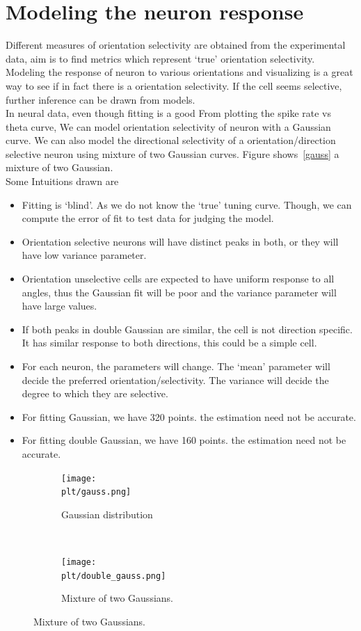 \documentclass[11pt]{article}
\newcommand{\plt}{../../plots}
\newcommand{\rulesep}{\unskip\ \vrule\ }
\begin{document}
\section{Modeling the neuron response} %
\label{sub:modeling_the_neuron_response}
Different measures of orientation selectivity are obtained from the experimental data, aim is to find metrics which represent `true' orientation selectivity. Modeling the response of neuron to various orientations and visualizing is a great way to see if in fact there is a orientation selectivity. If the cell seems selective, further inference can be drawn from models.\\
In neural data, even though fitting is a good 
From plotting the spike rate vs theta curve, We can model orientation selectivity of neuron with a Gaussian curve. We can also model the directional selectivity of a orientation/direction selective neuron using mixture of two Gaussian curves. Figure shows~\ref{gauss} a mixture of two Gaussian.\\
Some Intuitions drawn are
\begin{itemize}
    \item Fitting is `blind'. As we do not know the `true' tuning curve. Though, we can compute the error of fit to test data for judging the model.
    \item Orientation selective neurons will have distinct peaks in both, or they will have low variance parameter.
    \item Orientation unselective cells are expected to have uniform response to all angles, thus the Gaussian fit will be poor and the variance parameter will have large values.
    \item If both peaks in double Gaussian are similar, the cell is not direction specific. It has similar response to both directions, this could be a simple cell.
    \item For each neuron, the parameters will change. The `mean' parameter will decide the preferred orientation/selectivity. The variance will decide the degree to which they are selective.
    \item For fitting Gaussian,  we have 320 points. the estimation need not be accurate.
    \item For fitting double Gaussian,  we have 160 points. the estimation need not be accurate.
\end{itemize}

\begin{figure}
\centering
\caption{Modeling orientation and directional selectivity using Gaussians}
\label{gauss}
\begin{subfigure}{.48\textwidth}
    \centering
    \texttt{[image: \\plt/gauss.png]}
    \caption{Gaussian distribution}
\end{subfigure}
\rulesep
\begin{subfigure}{.48\textwidth}
    \centering
    \texttt{[image: \\plt/double\_gauss.png]}
    \caption{Mixture of two Gaussians.}
\end{subfigure}
\end{figure}
\end{document}
